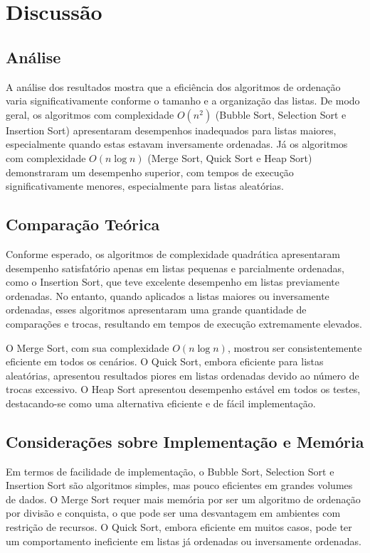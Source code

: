 \documentclass[tcc2]{uftex}
\begin{document}
\chapter{Discussão}
\section{Análise}
A análise dos resultados mostra que a eficiência dos algoritmos de ordenação varia significativamente conforme o tamanho e a organização das listas. De modo geral, os algoritmos com complexidade \(O(n^2)\) (Bubble Sort, Selection Sort e Insertion Sort) apresentaram desempenhos inadequados para listas maiores, especialmente quando estas estavam inversamente ordenadas. Já os algoritmos com complexidade \(O(n \log ⁡n)\) (Merge Sort, Quick Sort e Heap Sort) demonstraram um desempenho superior, com tempos de execução significativamente menores, especialmente para listas aleatórias.

\section{Comparação Teórica}
Conforme esperado, os algoritmos de complexidade quadrática apresentaram desempenho satisfatório apenas em listas pequenas e parcialmente ordenadas, como o Insertion Sort, que teve excelente desempenho em listas previamente ordenadas. No entanto, quando aplicados a listas maiores ou inversamente ordenadas, esses algoritmos apresentaram uma grande quantidade de comparações e trocas, resultando em tempos de execução extremamente elevados.

O Merge Sort, com sua complexidade \(O(n \log ⁡n)\), mostrou ser consistentemente eficiente em todos os cenários. O Quick Sort, embora eficiente para listas aleatórias, apresentou resultados piores em listas ordenadas devido ao número de trocas excessivo. O Heap Sort apresentou desempenho estável em todos os testes, destacando-se como uma alternativa eficiente e de fácil implementação.

\section{Considerações sobre Implementação e Memória}
Em termos de facilidade de implementação, o Bubble Sort, Selection Sort e Insertion Sort são algoritmos simples, mas pouco eficientes em grandes volumes de dados. O Merge Sort requer mais memória por ser um algoritmo de ordenação por divisão e conquista, o que pode ser uma desvantagem em ambientes com restrição de recursos. O Quick Sort, embora eficiente em muitos casos, pode ter um comportamento ineficiente em listas já ordenadas ou inversamente ordenadas.
\end{document}
